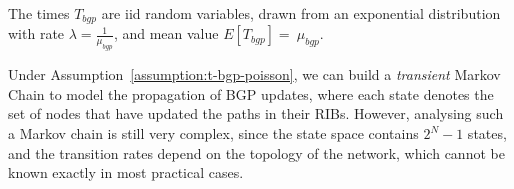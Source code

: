 %

\begin{assumption}\label{assumption:t-bgp-poisson}
The times $T_{bgp}$ are iid random variables, drawn from an exponential distribution with rate $\lambda = \frac{1}{\mu_{bgp}}$, and mean value $E[T_{bgp}] =~\mu_{bgp}$.
\end{assumption}

Under Assumption~\ref{assumption:t-bgp-poisson}, we can build a \textit{transient} Markov Chain  to model the propagation of BGP updates, where each state denotes the set of nodes that have updated the paths in their RIBs. However, analysing such a Markov chain is still very complex, since the state space contains $2^{N}-1$ states, and the transition rates depend on the topology of the network, which cannot be known exactly in most practical cases.


